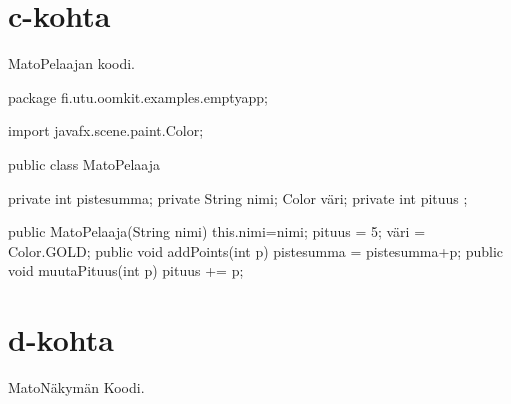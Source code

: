 \section{c-kohta}
\label{c-kohta}
MatoPelaajan koodi.
\begin{javacode}
package fi.utu.oomkit.examples.emptyapp;

import javafx.scene.paint.Color;

public class MatoPelaaja {
	
	private int pistesumma;
	private String nimi;
	 Color väri;
	private int pituus ;
	
	public MatoPelaaja(String nimi) {
		this.nimi=nimi;
		pituus = 5;
		väri = Color.GOLD;
	}
	public void addPoints(int p) {
		pistesumma = pistesumma+p;
	}
	public void muutaPituus(int p) {
		pituus += p;
	}

}

\end{javacode}

\section{d-kohta}
\label{d-kohta}

MatoNäkymän Koodi.

